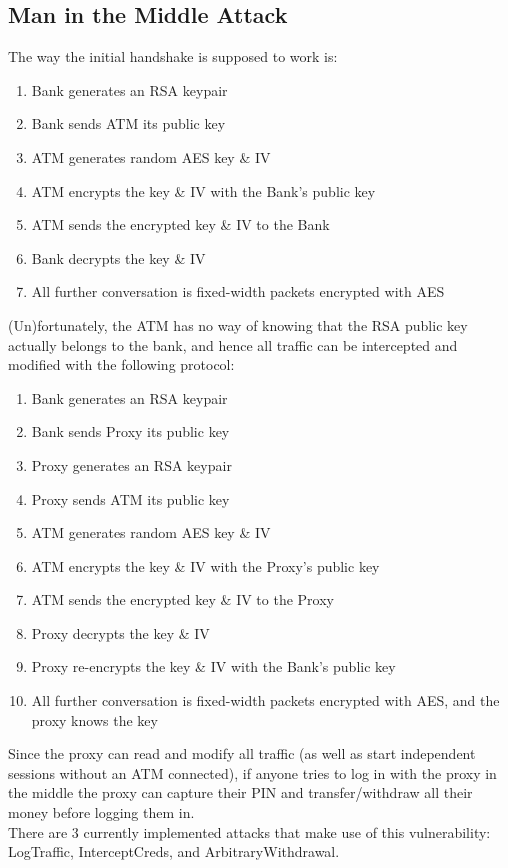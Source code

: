 \documentclass[12pt]{article}
\begin{document}
\subsection*{Man in the Middle Attack}
The way the initial handshake is supposed to work is:
\begin{enumerate}[1)]
\item Bank generates an RSA keypair
\item Bank sends ATM its public key
\item ATM generates random AES key \& IV
\item ATM encrypts the key \& IV with the Bank's public key
\item ATM sends the encrypted key \& IV to the Bank
\item Bank decrypts the key \& IV
\item All further conversation is fixed-width packets encrypted with AES
\end{enumerate}
(Un)fortunately, the ATM has no way of knowing that the RSA public key actually belongs to the bank, and hence all traffic can be intercepted and modified with the following protocol:
\begin{enumerate}[1)]
\item Bank generates an RSA keypair
\item Bank sends Proxy its public key
\item Proxy generates an RSA keypair
\item Proxy sends ATM its public key
\item ATM generates random AES key \& IV
\item ATM encrypts the key \& IV with the Proxy's public key
\item ATM sends the encrypted key \& IV to the Proxy
\item Proxy decrypts the key \& IV
\item Proxy re-encrypts the key \& IV with the Bank's public key
\item All further conversation is fixed-width packets encrypted with AES, and the proxy knows the key
\end{enumerate}
Since the proxy can read and modify all traffic (as well as start independent sessions without an ATM connected), if anyone tries to log in with the proxy in the middle the proxy can capture their PIN and transfer/withdraw all their money before logging them in.
\\
There are 3 currently implemented attacks that make use of this vulnerability: LogTraffic, InterceptCreds, and ArbitraryWithdrawal.
\end{document}
